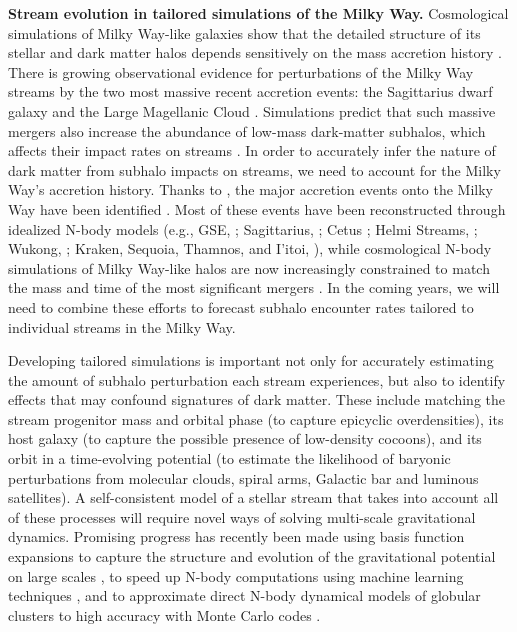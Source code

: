 \documentclass[final,5p,times,twocolumn,authoryear]{elsarticle}
\begin{document}
\textbf{Stream evolution in tailored simulations of the Milky Way.}
Cosmological simulations of Milky Way-like galaxies show that the detailed structure of its stellar and dark matter halos depends sensitively on the mass accretion history \citep[e.g.,][]{bullock:2005,springel:2008,cooper:2010,hopkins:2018,bose:2020,pillepich:2023}.
There is growing observational evidence for perturbations of the Milky Way streams by the two most massive recent accretion events: the Sagittarius dwarf galaxy \citep[e.g.,][]{bonaca:2020,li:2021,woudenberg:2023} and the Large Magellanic Cloud \citep[e.g.,][]{erkal:2019, shipp:2019, lilleengen:2023, koposov:2023}.
Simulations predict that such massive mergers also increase the abundance of low-mass dark-matter subhalos, which affects their impact rates on streams \citep[e.g.,][]{barry:2023, arora:2023}.
In order to accurately infer the nature of dark matter from subhalo impacts on streams, we need to account for the Milky Way's accretion history.
Thanks to \gaia, the major accretion events onto the Milky Way have been identified \citep[e.g.,][and references therein]{kruijssen:2020}.
Most of these events have been reconstructed through idealized N-body models (e.g., GSE, \citealt{naidu:2021}; Sagittarius, \citealt{vasiliev:2021}; Cetus \citealt{chang:2020}; Helmi Streams, \citealt{koppelman:2019}; Wukong, \citealt{malhan:2021b}; Kraken, Sequoia, Thamnos, and I'itoi, \citealt{sharpe:2024}), while cosmological N-body simulations of Milky Way-like halos are now increasingly constrained to match the mass and time of the most significant mergers \citep[e.g.,][]{nadler:2020,buch:2024}.
In the coming years, we will need to combine these efforts to forecast subhalo encounter rates tailored to individual streams in the Milky Way.

Developing tailored simulations is important not only for accurately estimating the amount of subhalo perturbation each stream experiences, but also to identify effects that may confound signatures of dark matter.
These include matching the stream progenitor mass and orbital phase (to capture epicyclic overdensities), its host galaxy (to capture the possible presence of low-density cocoons), and its orbit in a time-evolving potential (to estimate the likelihood of baryonic perturbations from molecular clouds, spiral arms, Galactic bar and luminous satellites).
A self-consistent model of a stellar stream that takes into account all of these processes will require novel ways of solving multi-scale gravitational dynamics.
Promising progress has recently been made using basis function expansions to capture the structure and evolution of the gravitational potential on large scales \citep{garavito-camargo:2021,petersen:2022}, to speed up N-body computations using machine learning techniques \citep{breen:2020,villaescusa-navarro:2021}, and to approximate direct N-body dynamical models of globular clusters to high accuracy with Monte Carlo codes \citep{rodriguez:2015,kremer:2020}.
\end{document}
